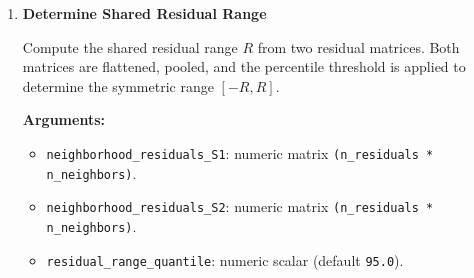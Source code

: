 \begin{enumerate}
        Compute the shared residual range \(R\) from a precomputed residual pool and its sorting permutation.  
        This expert interface assumes that residuals have already been flattened, cleaned, and sorted externally.

        \textbf{Arguments:}
        \begin{itemize}
            \item \lstinline!residual_pool!: numeric vector of absolute residuals (NaNs removed).
            \item \lstinline!residual_pool_perm!: integer vector giving the permutation that sorts \lstinline!residual_pool!.
            \item \lstinline!residual_range_quantile!: numeric scalar specifying the percentile (default \lstinline!95.0!).
        \end{itemize}

        \textbf{Returns:}
        \begin{itemize}
            \item \lstinline!numeric!: shared residual range \(R\).
        \end{itemize}

        \begin{lstlisting}[language=R, caption={Shared Residual Range (Expert)}]
R <- tox_determine_shared_residual_range_expert(
  residual_pool,
  residual_pool_perm,
  residual_range_quantile = 95.0
)
        \end{lstlisting}

    \item \textbf{Determine Shared Residual Range}

        Compute the shared residual range \(R\) from two residual matrices.  
        Both matrices are flattened, pooled, and the percentile threshold is applied to determine the symmetric range \([-R, R]\).

        \textbf{Arguments:}
        \begin{itemize}
            \item \lstinline!neighborhood_residuals_S1!: numeric matrix \lstinline!(n_residuals * n_neighbors)!.
            \item \lstinline!neighborhood_residuals_S2!: numeric matrix \lstinline!(n_residuals * n_neighbors)!.
            \item \lstinline!residual_range_quantile!: numeric scalar (default \lstinline!95.0!).
        \end{itemize}


\end{enumerate}
